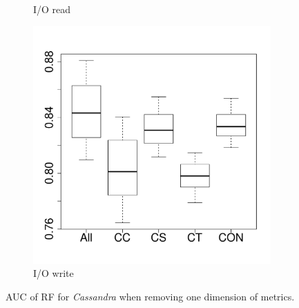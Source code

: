 \begin{figure}[t]
\begin{subfigure}{0.19\textwidth}
                \caption{I/O read}
        \end{subfigure}
        \begin{subfigure}{0.19\textwidth}
                \includegraphics[width=\linewidth]{Figures/iowrite-cassandraremove-importance.pdf}
                \caption{I/O write}
        \end{subfigure}
        
	\caption{AUC of RF for \emph{Cassandra} when removing one dimension of metrics.} %
	\label{fig:importance-dimenssion-remove-cassandra}
\end{figure}




